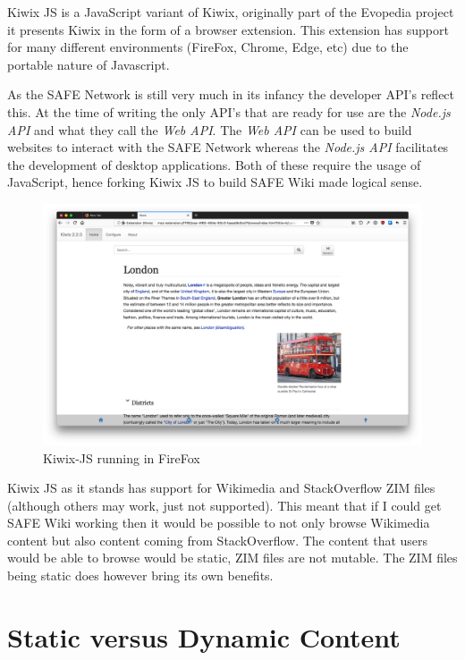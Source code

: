Kiwix JS is a JavaScript variant of Kiwix, originally part of the Evopedia project it presents Kiwix in the form of a browser extension. This extension has support for many different environments (FireFox, Chrome, Edge, etc) due to the portable nature of Javascript.

As the SAFE Network is still very much in its infancy the developer API's reflect this. At the time of writing the only API's that are ready for use are the \textit{Node.js API} and what they call the \textit{Web API}. The \textit{Web API} can be used to build websites to interact with the SAFE Network whereas the \textit{Node.js API} facilitates the development of desktop applications. Both of these require the usage of JavaScript, hence forking Kiwix JS to build SAFE Wiki made logical sense.

\begin{figure}
	\begin{center}
			\includegraphics[width=\textwidth]{images/kiwix-js-extension}
		\caption{Kiwix-JS running in FireFox}
		\label{fig:kiwix-firefox}
	\end{center}
\end{figure}

Kiwix JS as it stands has support for Wikimedia and StackOverflow ZIM files (although others may work, just not supported). This meant that if I could get SAFE Wiki working then it would be possible to not only browse Wikimedia content but also content coming from StackOverflow. The content that users would be able to browse would be static, ZIM files are not mutable. The ZIM files being static does however bring its own benefits.

\section{Static versus Dynamic Content}

